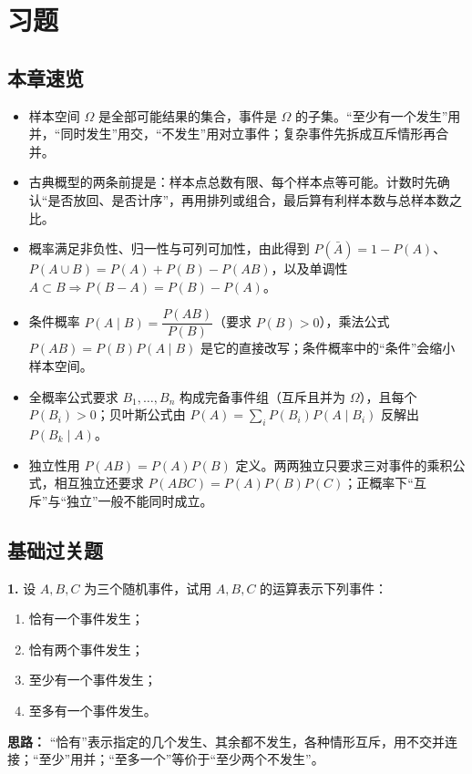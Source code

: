 \section{习题}

\subsection{本章速览}

\begin{itemize}
    \item 样本空间 $\Omega$ 是全部可能结果的集合，事件是 $\Omega$ 的子集。“至少有一个发生”用并，“同时发生”用交，“不发生”用对立事件；复杂事件先拆成互斥情形再合并。
    \item 古典概型的两条前提是：样本点总数有限、每个样本点等可能。计数时先确认“是否放回、是否计序”，再用排列或组合，最后算有利样本数与总样本数之比。
    \item 概率满足非负性、归一性与可列可加性，由此得到 $P(\bar A)=1-P(A)$、$P(A\cup B)=P(A)+P(B)-P(AB)$，以及单调性 $A\subset B\Rightarrow P(B-A)=P(B)-P(A)$。
    \item 条件概率 $P(A\mid B)=\dfrac{P(AB)}{P(B)}$（要求 $P(B)>0$），乘法公式 $P(AB)=P(B)P(A\mid B)$ 是它的直接改写；条件概率中的“条件”会缩小样本空间。
    \item 全概率公式要求 $B_1,\ldots,B_n$ 构成完备事件组（互斥且并为 $\Omega$），且每个 $P(B_i)>0$；贝叶斯公式由 $P(A)=\sum_i P(B_i)P(A\mid B_i)$ 反解出 $P(B_k\mid A)$。
    \item 独立性用 $P(AB)=P(A)P(B)$ 定义。两两独立只要求三对事件的乘积公式，相互独立还要求 $P(ABC)=P(A)P(B)P(C)$；正概率下“互斥”与“独立”一般不能同时成立。
\end{itemize}

\subsection{基础过关题}

\textbf{1.} 设 $A,B,C$ 为三个随机事件，试用 $A,B,C$ 的运算表示下列事件：
\begin{enumerate}[label=(\arabic*)]
    \item 恰有一个事件发生；
    \item 恰有两个事件发生；
    \item 至少有一个事件发生；
    \item 至多有一个事件发生。
\end{enumerate}

\ifshowsolutions%
\textbf{思路：} “恰有”表示指定的几个发生、其余都不发生，各种情形互斥，用不交并连接；“至少”用并；“至多一个”等价于“至少两个不发生”。

